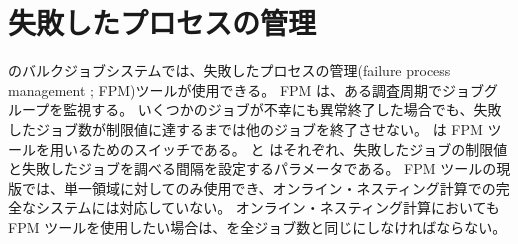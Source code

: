 \section{失敗したプロセスの管理}
\scalerm のバルクジョブシステムでは、失敗したプロセスの管理(failure process management ; FPM)ツールが使用できる。
FPM は、ある調査周期でジョブグループを監視する。
いくつかのジョブが不幸にも異常終了した場合でも、失敗したジョブ数が制限値に達するまでは他のジョブを終了させない。
 は FPM ツールを用いるためのスイッチである。
 と  はそれぞれ、失敗したジョブの制限値と失敗したジョブを調べる間隔を設定するパラメータである。
FPM ツールの現版では、単一領域に対してのみ使用でき、オンライン・ネスティング計算での完全なシステムには対応していない。
オンライン・ネスティング計算においても FPM ツールを使用したい場合は、を全ジョブ数と同じにしなければならない。


